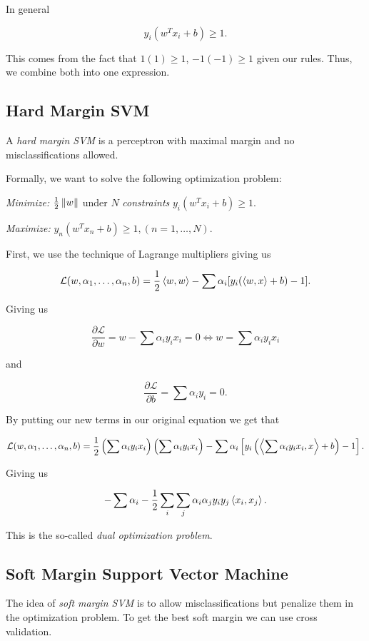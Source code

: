 In general

\[
	y_i (w^T x_i + b) \ge 1.
\]

This comes from the fact that \(1 (1) \ge 1\), \(-1 (-1) \ge 1\) given our rules. Thus, we combine both into 
one expression.

\subsection{Hard Margin SVM}

A \emph{hard margin SVM} is a perceptron with maximal margin and no misclassifications allowed.

Formally, we want to solve the following optimization problem:

\emph{Minimize:} \(\frac{1}{2}\left\| w \right\|\) under \(N\) \emph{constraints} \(y_i (w^T x_i + b) \ge 1\).

\emph{Maximize:} \(y_n (w^T x_n + b) \ge 1, (n = 1, \dots, N)\).

First, we use the technique of Lagrange multipliers giving us

\[
	\mathcal{L}(w, \alpha_1, \dots, \alpha_n, b) = \frac{1}{2} \left\langle w, w\right\rangle - \sum \alpha_i [y_i (\left\langle w, x\right\rangle + b) - 1].
\]

Giving us 

\[
	\frac{\partial \mathcal{L}}{\partial w} = w - \sum \alpha_i y_i x_i = 0 \iff w = \sum \alpha_i y_i x_i
\]

and 

\[
	\frac{\partial \mathcal{L}}{\partial b} = \sum \alpha_i y_i = 0.
\]


By putting our new terms in our original equation we get that 

\[
	\mathcal{L}(w, \alpha_1, \dots, \alpha_n, b) = \frac{1}{2} \left(\sum \alpha_i y_i x_i\right) \left(\sum \alpha_i y_i x_i\right) - 
	\sum \alpha_i \left[y_i \left(\left\langle\sum \alpha_i y_i x_i, x\right\rangle + b\right) - 1\right].
\]

Giving us 

\[
	- \sum \alpha_i - \frac{1}{2} \sum_i \sum_j \alpha_i \alpha_j y_i y_j \left\langle x_i, x_j\right\rangle.
\]

This is the so-called \emph{dual optimization problem}.

\subsection{Soft Margin Support Vector Machine}

The idea of \emph{soft margin SVM} is to allow misclassifications but penalize them in the optimization problem.
To get the best soft margin we can use cross validation.

